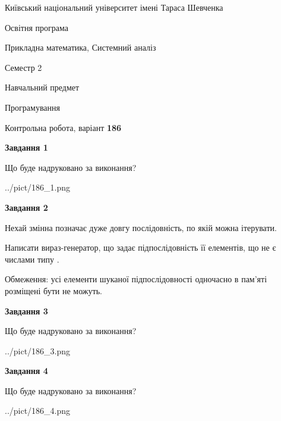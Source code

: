 \documentclass[12pt, ukrainian]{article}
\begin{document}
{{\begin {small}\par
{ \center  Київський національний університет імені Тараса Шевченка \par}
{\parbox {5 cm}{Освітня програма \hfill}{\parbox {8 cm}{Прикладна математика, Системний аналіз \hfill}}\parbox {5 cm}{\hfill Семестр 2}}\par
{\parbox {5 cm} {Навчальний предмет \hfill}\parbox {7 cm}{Програмування \hfill}\parbox {6cm}{\hfill}\par}\vspace{-7pt} \end{small}}{\center Контрольна робота, варіант  \No \textbf
{ 186 }\par}}
{
\begin {large}
{\begin {center}\textbf{Завдання 1}\end {center}}\par
Що буде надруковано за виконання?\par\par
\begin{center}
	{../pict/186_1.png}
\end{center}
\newpage

{\begin {center}\textbf{Завдання 2}\end {center}}\par
Нехай змінна  позначає дуже довгу послідовність, по якій можна ітерувати.

Написати вираз-генератор, що задає підпослідовність її елементів, що не є числами типу .

Обмеження: усі елементи шуканої підпослідовності одночасно в пам'яті розміщені бути не можуть.\par
\newpage

{\begin {center}\textbf{Завдання 3}\end {center}}\par
Що буде надруковано за виконання?\par
\begin{center}
	{../pict/186_3.png}
\end{center}
\newpage

{\begin {center}\textbf{Завдання 4}\end {center}}\par
Що буде надруковано за виконання?\par
\begin{center}
	{../pict/186_4.png}
\end{center}
\newpage


\end{large}}
\end{document}
